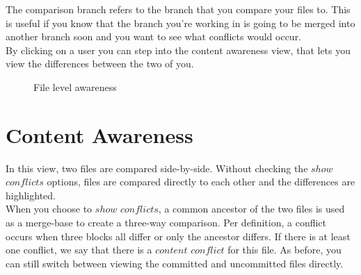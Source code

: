 The comparison branch refers to the branch that you compare your files to. This is useful if you know that the branch you're working in is going to be merged into another branch soon and you want to see what conflicts would occur. \\

By clicking on a user you can step into the content awareness view, that lets you view the differences between the two of you.



\begin{figure}[h!]
  \centering
  \caption{File level awareness}
  \label{fig:filelevel}
\end{figure}



\section{Content Awareness}

In this view, two files are compared side-by-side. Without checking the $show$ $conflicts$ options, files are compared directly to each other and the differences are highlighted. \\

When you choose to $show$ $conflicts$, a common ancestor of the two files is used as a merge-base to create a three-way comparison. Per definition, a conflict occurs when three blocks all differ or only the ancestor differs. If there is at least one conflict, we say that there is a $content$ $conflict$ for this file. As before, you can still switch between viewing the committed and uncommitted files directly.



